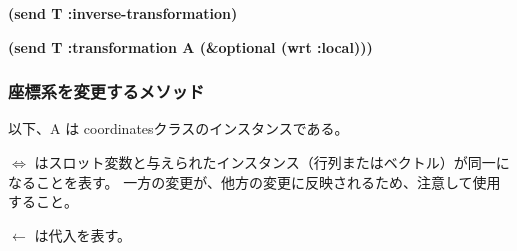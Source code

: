 \begin{refdesc}

{\bf (send T :inverse-transformation)}

{\bf (send T :transformation A (\&optional (wrt :local)))}

\end{refdesc}

\subsubsection*{座標系を変更するメソッド}

以下、A は coordinatesクラスのインスタンスである。

$\Leftrightarrow$ はスロット変数と与えられたインスタンス（行列またはベクトル）が同一になることを表す。
一方の変更が、他方の変更に反映されるため、注意して使用すること。

$\leftarrow$ は代入を表す。

